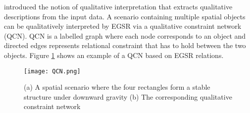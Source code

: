 \documentclass[letterpaper]{article}
\begin{document}
\cite{wallgrun2010qualitative} introduced the notion of qualitative interpretation that extracts qualitative descriptions from the input data. A scenario containing multiple spatial objects can be qualitatively interpreted by EGSR via a qualitative constraint network (QCN). QCN is a labelled graph where each node corresponds to an object and directed edges represents relational constraint that has to hold between the two objects. 
Figure \ref{QCN} shows an example of a QCN based on EGSR relations.

 \begin{figure}[h!]
\centering\texttt{[image: QCN.png]}\caption{(a) A spatial scenario where the four rectangles form a stable structure under downward gravity (b) The corresponding qualitative constraint network}
\label{QCN}
\end{figure}
\end{document}
